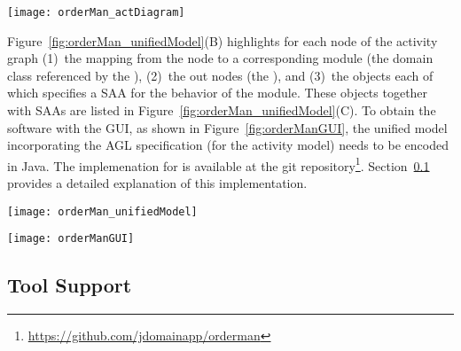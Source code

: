 \begin{figure*}[ht]
	\centering
	\texttt{[image: orderMan\_actDiagram]}
	\caption{The UML activity diagram for the process to handle orders, adapted from~\cite[p.~369]{omg_unified_2017}.} %
	\vspace{-0.2cm}
	\label{fig:orderMan_actDiagram}
\end{figure*}

Figure~\ref{fig:orderMan_unifiedModel}(B) highlights for each node of the activity graph (1)~the mapping from the node to a corresponding module (\wrt the domain class referenced by the ), (2)~the out nodes (\wrt the ), and (3)~the  objects each of which specifies a SAA for the behavior of the module. These  objects together with SAAs are listed in Figure~\ref{fig:orderMan_unifiedModel}(C). To obtain the \orderman software with the GUI, as shown in Figure~\ref{fig:orderManGUI}, %
the unified model incorporating the AGL specification (for the activity model) needs to be encoded in Java. The implemenation for \orderman is available at the git repository\footnote{\url{https://github.com/jdomainapp/orderman}}. Section~\ref{subsect:toolSupport} provides a detailed explanation of this implementation.
%
\begin{figure*}[ht]
	\centering
	\texttt{[image: orderMan\_unifiedModel]}
	\caption{(A: Left) The activity graph whose nodes are labeled with activity and component classes; (B: Top-right) The  objects; (C: Bottom-right)  objects that are referenced by the .} %
	\label{fig:orderMan_unifiedModel}
	\vspace{-0.2cm}
\end{figure*}

\begin{figure*}[ht]
	\centering
	\texttt{[image: orderManGUI]}
	\caption{The GUI of the \orderman~software generated by the tool.} %
	\vspace{-0.3cm}
	\label{fig:orderManGUI}
\end{figure*}

\subsection{Tool Support}
\label{subsect:toolSupport} %

